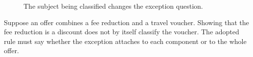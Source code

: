 \begin{figure}[H]
\centering
{}
\caption{The subject being classified changes the exception question.}\label{fig:teach-M01-05}
\end{figure}

Suppose an offer combines a fee reduction and a travel voucher. Showing that the fee reduction is a discount does not by itself classify the voucher. The adopted rule must say whether the exception attaches to each component or to the whole offer.

